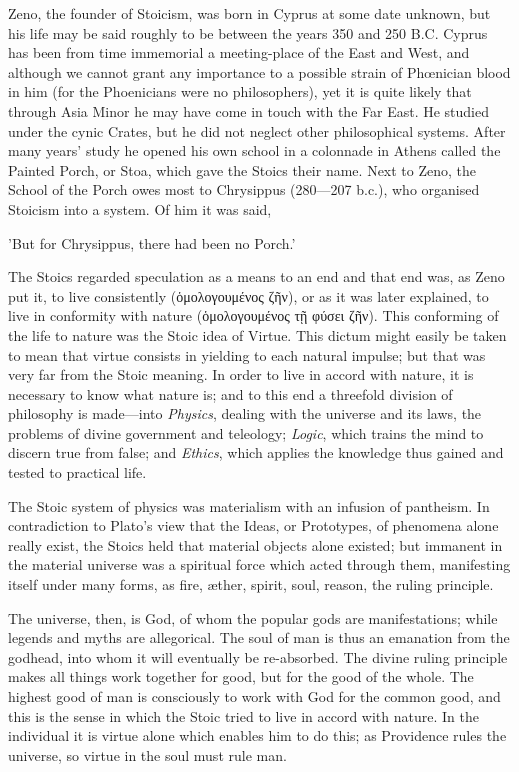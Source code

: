 Zeno, the founder of Stoicism, was born in Cyprus at some date unknown, but his
life may be said roughly to be between the years 350 and 250 B.C. Cyprus has
been from time immemorial a meeting-place of the East and West, and although we
cannot grant any importance to a possible strain of Phœnician blood in him
(for the Phoenicians were no philosophers), yet it is quite likely that through
Asia Minor he may have come in touch with the Far East. He studied under the
cynic Crates, but he did not neglect other philosophical systems. After many
years' study he opened his own school in a colonnade in Athens called the
Painted Porch, or Stoa, which gave the Stoics their name. Next to Zeno, the
School of the Porch owes most to Chrysippus (280—207 b.c.), who organised
Stoicism into a system. Of him it was said,

'But for Chrysippus, there had been no Porch.'

The Stoics regarded speculation as a means to an end and that end was, as Zeno
put it, to live consistently
(ὁμολογουμένος
ζῆν), or as it was later explained, to live in conformity with
nature
(ὁμολογουμένος
τῇ φύσει ζῆν). This
conforming of the life to nature was the Stoic idea of Virtue. This dictum
might easily be taken to mean that virtue consists in yielding to each natural
impulse; but that was very far from the Stoic meaning. In order to live in
accord with nature, it is necessary to know what nature is; and to this end a
threefold division of philosophy is made—into \emph{Physics}, dealing
with the universe and its laws, the problems of divine government and
teleology; \emph{Logic}, which trains the mind to discern true from false; and
\emph{Ethics}, which applies the knowledge thus gained and tested to practical
life.

The Stoic system of physics was materialism with an infusion of pantheism. In
contradiction to Plato's view that the Ideas, or Prototypes, of phenomena alone
really exist, the Stoics held that material objects alone existed; but immanent
in the material universe was a spiritual force which acted through them,
manifesting itself under many forms, as fire, æther, spirit, soul, reason, the
ruling principle.

The universe, then, is God, of whom the popular gods are manifestations; while
legends and myths are allegorical. The soul of man is thus an emanation from
the godhead, into whom it will eventually be re-absorbed. The divine ruling
principle makes all things work together for good, but for the good of the
whole. The highest good of man is consciously to work with God for the common
good, and this is the sense in which the Stoic tried to live in accord with
nature. In the individual it is virtue alone which enables him to do this; as
Providence rules the universe, so virtue in the soul must rule man.

